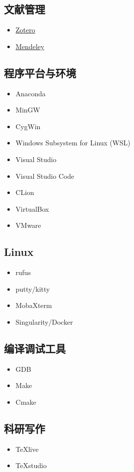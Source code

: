 \subsection{文献管理}
\begin{itemize}
\item \href{https://www.zotero.org/}{Zotero}
\item \href{https://www.mendeley.com/}{Mendeley}
\end{itemize}


\subsection{程序平台与环境}
\begin{itemize}
\item Anaconda
\item MinGW
\item CygWin
\item Windows Subsystem for Linux (WSL)
\item Visual Studio
\item Visual Studio Code
\item CLion
\item VirtualBox
\item VMware
\end{itemize}

\subsection{Linux}
\begin{itemize}
\item rufus
\item putty/kitty
\item MobaXterm
\item Singularity/Docker
\end{itemize}

\subsection{编译调试工具}
\begin{itemize}
\item GDB
\item Make
\item Cmake
\end{itemize}

\subsection{科研写作}
\begin{itemize}
\item TeXlive
\item TeXstudio
\end{itemize}

